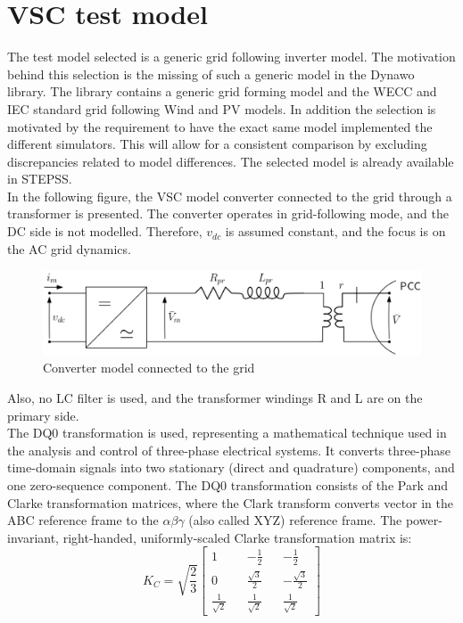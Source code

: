\documentclass{report}
\begin{document}
\section{VSC test model}
The test model selected is a generic grid following inverter model. The motivation behind this selection is the missing of such a generic model in the Dynawo library. The library contains a generic grid forming model and the WECC and IEC standard grid following Wind and PV models. In addition the selection is motivated by the requirement to have the exact same model implemented the different simulators. This will allow for a consistent comparison by excluding discrepancies related to model differences. The selected model is already available in STEPSS.
\\
In the following figure, the VSC model converter connected to the grid through a transformer is presented. The converter operates in grid-following mode, and the DC side is not modelled. Therefore, $v_{dc}$ is assumed constant, and the focus is on the AC grid dynamics.
\begin{figure}[H]
    \centering
    \includegraphics[scale = 0.3]{Figure_converter/converter_model.png}
    \caption{Converter model connected to the grid}
    \label{fig:converter_model}
\end{figure}
Also, no LC filter is used, and the transformer windings R and L are on the primary side.
\\
The DQ0 transformation is used, representing a mathematical technique used in the analysis and control of three-phase electrical systems. It converts three-phase time-domain signals into two stationary (direct and quadrature) components, and one zero-sequence component. The DQ0 transformation consists of the Park and Clarke transformation matrices, where the Clark transform converts vector in the ABC reference frame to the $\alpha\beta\gamma$ (also called XYZ) reference frame. The power-invariant, right-handed, uniformly-scaled Clarke transformation matrix is:
\begin{equation}
    K_C = \sqrt{\frac{2}{3}} 
        \begin{bmatrix}
            1 && -\frac{1}{2} && -\frac{1}{2} \\
            0 && \frac{\sqrt{3}}{2} && -\frac{\sqrt{3}}{2} \\
            \frac{1}{\sqrt{2}} && \frac{1}{\sqrt{2}} && \frac{1}{\sqrt{2}}
        \end{bmatrix}
\end{equation}
\end{document}
